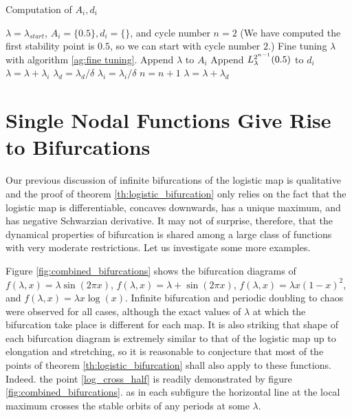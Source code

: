 \begin{algorithm}
	\caption{Computation of $A_i, d_i$}
	\begin{algorithmic}[1]
		\Require $\lambda = \lambda_{start}$, $A_i = \{0.5\}, d_i = \{\}$, and cycle number $n = 2$ (We have computed the first stability point is $0.5$, so we can start with cycle number $2$.)
		  
			\State Fine tuning $\lambda$ with algorithm \ref{ag:fine tuning}.
			\State Append $\lambda$ to $A_i$ 
			\State Append $L_{\lambda}^{2^{n-1}}(0.5)$ to $d_i$ 
			\State $\lambda = \lambda + \lambda_{i}$
			\State $\lambda_{d} = \lambda_d / \delta$  
			\State $\lambda_{i} = \lambda_i / \delta$
			\State $n = n + 1$
		\EndIf
		\State $\lambda = \lambda + \lambda_d$
		\EndWhile
	\end{algorithmic}
	\label{ag:compute A_i}
\end{algorithm}

\section{Single Nodal Functions Give Rise to Bifurcations}

Our previous discussion of infinite bifurcations of the logistic map is qualitative and the proof of theorem \ref{th:logistic_bifurcation} only relies on the fact that the logistic map is differentiable, concaves downwards, has a unique maximum, and has negative Schwarzian derivative. 
It may not of surprise, therefore, that the dynamical properties of bifurcation is shared among a large class of functions with very moderate restrictions.
Let us investigate some more examples.

Figure \ref{fig:combined_bifurcations} shows the bifurcation diagrams of $f(\lambda, x) = \lambda \sin(2\pi x)$, $f(\lambda, x) = \lambda + \sin(2\pi x)$, $f(\lambda, x) = \lambda x(1-x)^2$, and $f(\lambda, x) = \lambda x \log(x)$.
Infinite bifurcation and periodic doubling to chaos were observed for all cases, although the exact values of $\lambda$ at which the bifurcation take place is different for each map.
It is also striking that shape of each bifurcation diagram is extremely similar to that of the logistic map up to elongation and stretching, so it is reasonable to conjecture that most of the points of theorem \ref{th:logistic_bifurcation} shall also apply to these functions.
Indeed. the point \ref{log_cross_half} is readily demonstrated by figure \ref{fig:combined_bifurcations}.
as in each subfigure the horizontal line at the local maximum crosses the stable orbits of any periods at some $\lambda$.

